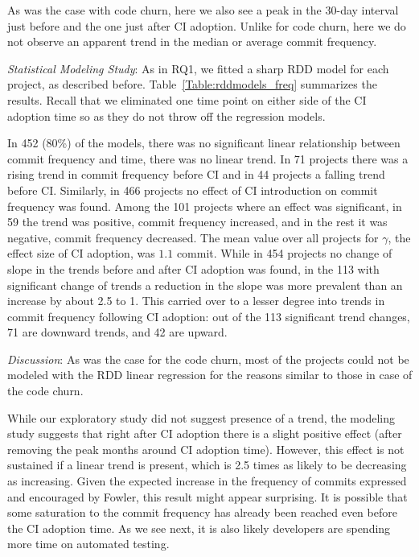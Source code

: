 As was the case with code churn, here we also see a peak in the 30-day 
interval just before and the one just after CI adoption.
Unlike for code churn, here we do not observe an apparent trend in the 
median or average commit frequency.

\smallskip\noindent \emph{Statistical Modeling Study}: 
As in RQ1, we fitted a sharp RDD model for each project, as described before.
Table~\ref{Table:rddmodels_freq} summarizes the results.
Recall that we eliminated one time point on either side of the CI adoption 
time so as they do not throw off the regression models.


In 452 (80\%) of the models, there was no significant linear relationship 
between commit frequency and time, \ie there was no linear trend.
In 71 projects there was a rising trend in commit frequency before CI 
and in 44 projects a falling trend before CI.
Similarly, in 466 projects no effect of CI introduction on commit frequency 
was found. 
Among the 101 projects where an effect was significant, in 59 the trend 
was positive, \ie commit frequency increased, and in the rest it was 
negative, \ie commit frequency decreased.
The mean value over all projects for $\gamma$, the effect size of CI 
adoption, was $1.1$ commit.
While in 454 projects no change of slope in the trends before and after CI 
adoption was found, in the 113 with significant change of trends a reduction 
in the slope was more prevalent than an increase by about 2.5 to 1.
This carried over to a lesser degree into trends in commit frequency 
following CI adoption: out of the 113 significant trend changes, 71 are 
downward trends, and 42 are upward.

\smallskip\noindent \emph{Discussion}:
As was the case for the code churn, most of the projects could not be 
modeled with the RDD linear regression for the reasons similar to those 
in case of the code churn.

While our exploratory study did not suggest presence of a trend, the 
modeling study suggests that right after CI adoption there is a slight 
positive effect (after removing the peak months around CI adoption time). 
However, this effect is not sustained if a linear trend is present, which is 
2.5 times as likely to be decreasing as increasing. 
Given the expected increase in the frequency of commits expressed and 
encouraged by Fowler, this result might appear surprising.
It is possible that some saturation to the commit frequency has already 
been reached even before the CI adoption time.
As we see next, it is also likely developers are spending more time on 
automated testing.


